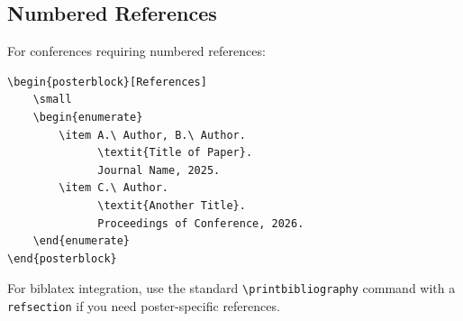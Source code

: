 \subsection{Numbered References}

For conferences requiring numbered references:

\begin{verbatim}
\begin{posterblock}[References]
    \small
    \begin{enumerate}
        \item A.\ Author, B.\ Author.
              \textit{Title of Paper}.
              Journal Name, 2025.
        \item C.\ Author.
              \textit{Another Title}.
              Proceedings of Conference, 2026.
    \end{enumerate}
\end{posterblock}
\end{verbatim}

For biblatex integration, use the standard
\texttt{\textbackslash printbibliography} command with a
\texttt{refsection} if you need poster-specific references.
